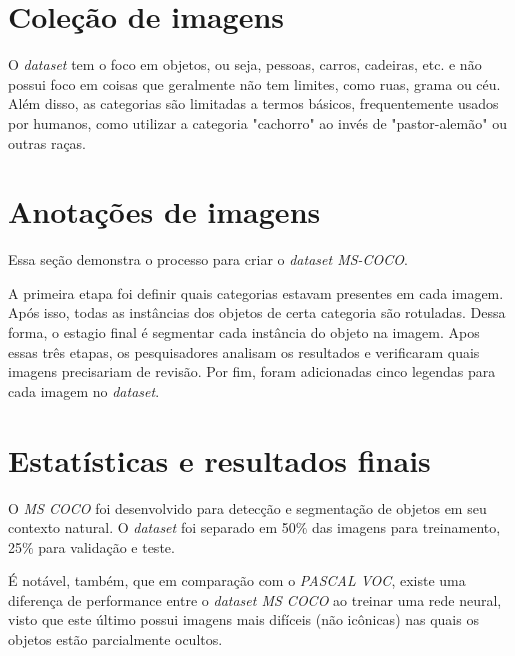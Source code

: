 \documentclass[12pt]{article}
\begin{document}
\section*{Coleção de imagens}

O \textit{dataset} tem o foco em objetos, ou seja, pessoas, carros, cadeiras, etc. e não possui foco em coisas que geralmente não tem limites, como ruas, grama ou céu. Além disso, as categorias são limitadas a termos básicos, frequentemente usados por humanos, como utilizar a categoria "cachorro" ao invés de "pastor-alemão" ou outras raças.

\section*{Anotações de imagens}

Essa seção demonstra o processo para criar o \textit{dataset MS-COCO}.

A primeira etapa foi definir quais categorias estavam presentes em cada imagem. Após isso, todas as instâncias dos objetos de certa categoria são rotuladas. Dessa forma, o estagio final é segmentar cada instância do objeto na imagem. Apos essas três etapas, os pesquisadores analisam os resultados e verificaram quais imagens precisariam de revisão. Por fim, foram adicionadas cinco legendas para cada imagem no \textit{dataset}.

\section*{Estatísticas e resultados finais}

O \textit{MS COCO} foi desenvolvido para detecção e segmentação de objetos em seu contexto natural. O \textit{dataset} foi separado em 50$\%$ das imagens para treinamento, 25$\%$ para validação e teste.

É notável, também, que em comparação com o \textit{PASCAL VOC}, existe uma diferença de performance entre o \textit{dataset MS COCO} ao treinar uma rede neural, visto que este último possui imagens mais difíceis (não icônicas) nas quais os objetos estão parcialmente ocultos.
\end{document}
